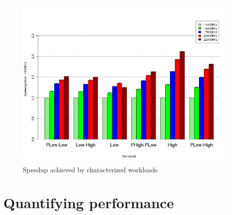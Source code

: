 \begin{figure}[h!]
  \begin{center}
    \includegraphics[height=3.5in]{figures/group_speedup.jpg}%
    \caption{Speedup achieved by characterized workloads}
    \label{fig:group_speedup}
  \end{center}
\end{figure}

\section{Quantifying performance}~\label{sec:quant_perf}

